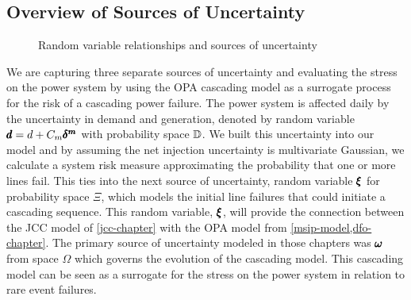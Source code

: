 \subsection{Overview of Sources of Uncertainty}

\begin{figure}
\centering
{} 
\caption{Random variable relationships and sources of uncertainty}
\end{figure}

We are capturing three separate sources of uncertainty and evaluating the stress on the power system by using the OPA cascading model as a surrogate process for the risk of a cascading power failure.  The power system is affected daily by the uncertainty in demand and generation, denoted by random variable $\pmb{d} = d + C_m \pmb{\delta^m}$ with  probability space $\mathbb{D}$.  We built this uncertainty into our model and by assuming the net injection uncertainty is multivariate Gaussian, we calculate a system risk measure approximating the probability that one or more lines fail.  This ties into the next source of uncertainty, random variable $\pmb{\xi}$ for probability space $\Xi$, which models the initial line failures that could initiate a cascading sequence.  This random variable, $\pmb{\xi}$, will provide the connection between the JCC model of \cref{jcc-chapter} with the OPA model from \cref{msip-model,dfo-chapter}.  The primary source of uncertainty modeled in those chapters was $\pmb{\omega}$ from space $\Omega$ which governs the evolution of the cascading model.  This cascading model can be seen as a surrogate for the stress on the power system in relation to rare event failures.     

